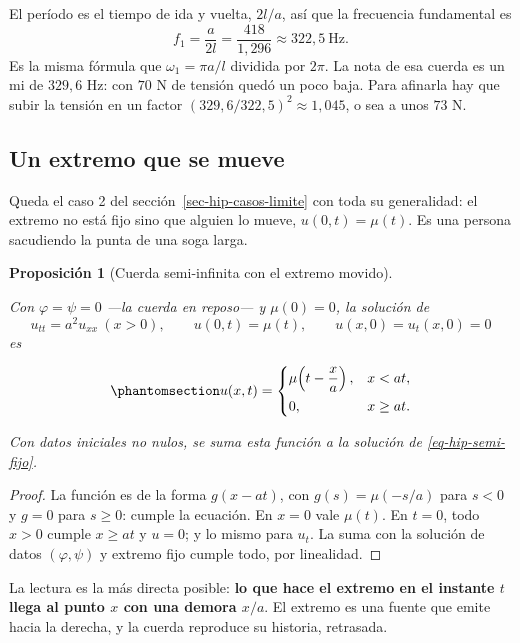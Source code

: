 \documentclass[
  spanish,
  a4paper,
]{scrbook}
\theoremstyle{definition}
\theoremstyle{plain}
\newtheorem{proposition}{Proposición}[chapter]
\theoremstyle{definition}
\theoremstyle{plain}
\theoremstyle{definition}
\theoremstyle{remark}
\begin{document}
El período es el tiempo de ida y vuelta, \(2l/a\), así que la frecuencia
fundamental es
\[f_1 = \frac{a}{2l} = \frac{418}{1{,}296} \approx 322{,}5\ \text{Hz}.\]
Es la misma fórmula que \(\omega_1 = \pi a/l\) dividida por \(2\pi\). La
nota de esa cuerda es un mi de \(329{,}6\) Hz: con \(70\) N de tensión
quedó un poco baja. Para afinarla hay que subir la tensión en un factor
\((329{,}6/322{,}5)^2 \approx 1{,}045\), o sea a unos \(73\) N.

\subsection{Un extremo que se mueve}\label{sec-hip-extremo-movil}

Queda el caso 2 del sección~\ref{sec-hip-casos-limite} con toda su
generalidad: el extremo no está fijo sino que alguien lo mueve,
\(u(0,t) = \mu(t)\). Es una persona sacudiendo la punta de una soga
larga.

\begin{proposition}[Cuerda semi-infinita con el extremo
movido]\protect\hypertarget{prp-hip-extremo-movil}{}\label{prp-hip-extremo-movil}

Con \(\varphi = \psi = 0\) ---la cuerda en reposo--- y \(\mu(0) = 0\),
la solución de
\[u_{tt} = a^2u_{xx}\ (x>0),\qquad u(0,t) = \mu(t),\qquad u(x,0) = u_t(x,0) = 0\]
es

\begin{equation}\protect\phantomsection\label{eq-hip-extremo-movil}{
u(x,t) = \begin{cases} \mu\!\left(t - \dfrac{x}{a}\right), & x < at,\\[2mm] 0, & x\ge at.\end{cases}
}\end{equation}

Con datos iniciales no nulos, se suma esta función a la solución de
\ref{eq-hip-semi-fijo}.

\end{proposition}

\begin{proof}
La función es de la forma \(g(x-at)\), con \(g(s) = \mu(-s/a)\) para
\(s<0\) y \(g = 0\) para \(s\ge0\): cumple la ecuación. En \(x=0\) vale
\(\mu(t)\). En \(t=0\), todo \(x>0\) cumple \(x\ge at\) y \(u=0\); y lo
mismo para \(u_t\). La suma con la solución de datos \((\varphi,\psi)\)
y extremo fijo cumple todo, por linealidad.
\end{proof}

La lectura es la más directa posible: \textbf{lo que hace el extremo en
el instante \(t\) llega al punto \(x\) con una demora \(x/a\)}. El
extremo es una fuente que emite hacia la derecha, y la cuerda reproduce
su historia, retrasada.
\end{document}
